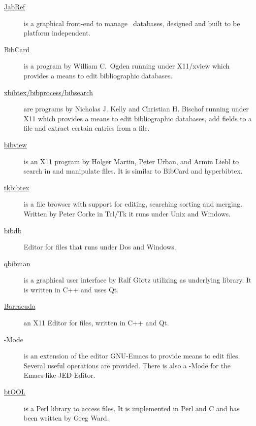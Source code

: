 \documentclass[11pt,a4paper]{scrbook}
\begin{document}
\begin{description}
\item
  [\href{https://www.ctan.org/pkg/jabref}{JabRef}]
  is a graphical front-end to manage \BibTeX\ databases, designed and built to
  be platform independent.
  
\item
  [\href{https://www.ctan.org/pkg/bibcard}{BibCard}]
  is a program by William C.~Ogden running under X11/xview which provides a
  means to edit bibliographic databases.
  
\item
  [\href{https://www.ctan.org/pkg/xbibtex}{xbibtex/bibprocess/bibsearch}]
  are programs by Nicholas J. Kelly and Christian H. Bischof running under X11
  which provides a means to edit bibliographic databases, add fields to a
  \BibTeX{} file and extract certain entries from a \BibTeX{} file.
    
\item
  [\href{https://www.ctan.org/pkg/bibview}{bibview}]
  is an X11 program by Holger Martin, Peter Urban, and Armin Liebl to search
  in and manipulate \BibTeX{} files. It is similar to BibCard and hyperbibtex.
 
\item
  [\href{https://www.ctan.org/pkg/tkbibtex}{tkbibtex}]
  is a \BibTeX{} file browser with support for editing, searching sorting and
  merging. Written by Peter Corke in Tcl/Tk it runs under Unix and Windows.

\item [\href{https://www.ctan.org/pkg/bibdb}{bibdb}] Editor
  for \BibTeX{} files that runs under Dos and Windows.
  
\item
  [\href{https://www.ctan.org/pkg/qbibman}{qbibman}]
  is a graphical user interface by Ralf G\"{o}rtz utilizing \BibTool{} as
  underlying library. It is written in C++ and uses Qt.
      
\item [\href{http://barracuda.linuxbox.com/}{Barracuda}] an X11 Editor for
  \BibTeX{} files, written in C++ and Qt.
 
\item [\BibTeX-Mode] is an extension of the editor GNU-Emacs to provide means
  to edit \BibTeX{} files. Several useful operations are provided.
  There is also a \BibTeX-Mode for the Emacs-like JED-Editor.
  
\item
  [\href{https://www.ctan.org/pkg/btool/}{btOOL}]
  is a Perl library to access \BibTeX{} files. It is implemented in Perl and C
  and has been written by Greg Ward.
  
\end{description}
\end{document}
